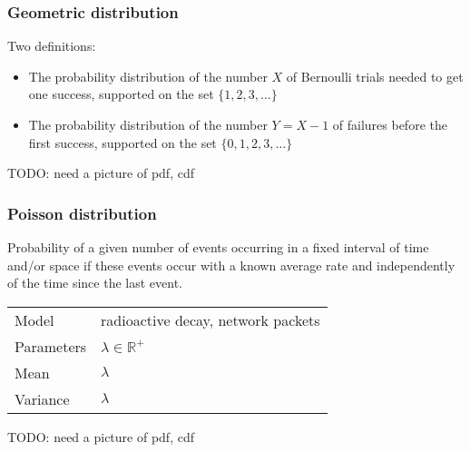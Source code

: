 \documentclass[t]{beamer}
\newcommand\smallgray[1]{\textcolor{gray}{\small\it #1}}
\newcommand\prevwork[1]{\smallgray{#1}}
\newcommand\R[0]{\mathbb{R}}
\begin{document}
\begin{frame}
  \frametitle{Geometric distribution}

  Two definitions:
  \begin{itemize}
  \item The probability distribution of the number $X$ of Bernoulli
    trials needed to get one success, supported on the set $\{1, 2, 3,
    \dotsc \}$
  \item The probability distribution of the number $Y = X - 1$ of
    failures before the first success, supported on the set $\{ 0, 1,
    2, 3, \dotsc \}$
  \end{itemize}

  \only<1>{\prevwork{Wikipedia, geometric distribution}}
  \only<2>{
    \begin{tabular}{ll}
      Model & \dots \\[1mm]
      Parameters & $p\in (0, 1]$ \\[1mm]
      Mean & $\frac 1p$ or $\frac{1-p}{p}$ \\[1mm]
      Variance & $\frac{1-p}{p^2}$
    \end{tabular}
    
  }

  TODO: need a picture of pdf, cdf
  
    
\end{frame}


\begin{frame}
  \frametitle{Poisson distribution}

  Probability of a given number of events occurring in a fixed
  interval of time and/or space if these events occur with a known
  average rate and independently of the time since the last event.
  \bigskip
  
  \begin{tabular}{ll}
    Model & radioactive decay, network packets\\[1mm]
    Parameters & $\lambda\in \R^+$\\[1mm]
    Mean & $\lambda$\\[1mm]
    Variance & $\lambda$
  \end{tabular}

  TODO: need a picture of pdf, cdf
  
  
\end{frame}
\end{document}
